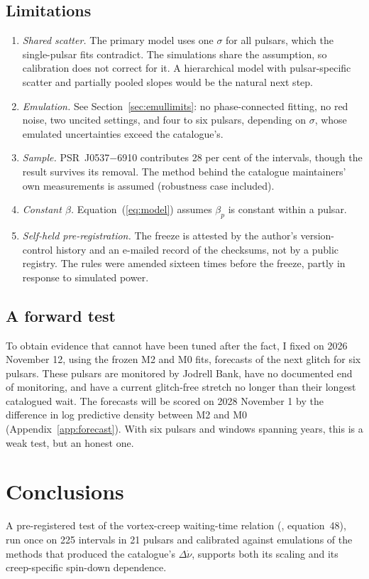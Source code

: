\documentclass[fleqn,usenatbib]{mnras}
\newcommand{\psr}[1]{PSR~#1}
\begin{document}
\subsection{Limitations}
\begin{enumerate}
\item \emph{Shared scatter.} The primary model uses one $\sigma$ for all
pulsars, which the single-pulsar fits contradict. The simulations share the
assumption, so calibration does not correct for it. A hierarchical model
with pulsar-specific scatter and partially pooled slopes would be the
natural next step.
\item \emph{Emulation.} See Section~\ref{sec:emullimits}: no
phase-connected fitting, no red noise, two uncited settings, and four to
six pulsars, depending on $\sigma$, whose emulated uncertainties exceed
the catalogue's.
\item \emph{Sample.} \psr{J0537$-$6910} contributes 28 per cent of the
intervals, though the result survives its removal. The method behind the
catalogue maintainers' own measurements is assumed (robustness case
included).
\item \emph{Constant $\beta$.} Equation~(\ref{eq:model}) assumes $\beta_p$
is constant within a pulsar.
\item \emph{Self-held pre-registration.} The freeze is attested by the
author's version-control history and an e-mailed record of the checksums, not
by a public registry. The rules were
amended sixteen times before the freeze, partly in response to simulated
power.
\end{enumerate}

\subsection{A forward test}
To obtain evidence that cannot have been tuned after the fact, I fixed on
2026 November 12, using the frozen M2 and M0 fits, forecasts of the next
glitch for six pulsars. These pulsars are monitored by Jodrell Bank, have
no documented end of monitoring, and have a current glitch-free stretch no
longer than their longest catalogued wait. The forecasts will be scored on
2028 November 1 by the difference in log predictive density between M2
and M0 (Appendix~\ref{app:forecast}). With six pulsars and windows spanning
years, this is a weak test, but an honest one.

\section{Conclusions}\label{sec:concl}
A pre-registered test of the vortex-creep waiting-time relation
(\citealt{zhou2022}, equation~48), run once on 225 intervals in 21 pulsars
and calibrated against emulations of the methods that produced the
catalogue's $\Delta\dot\nu$, supports both its scaling and its
creep-specific spin-down dependence.
\end{document}

